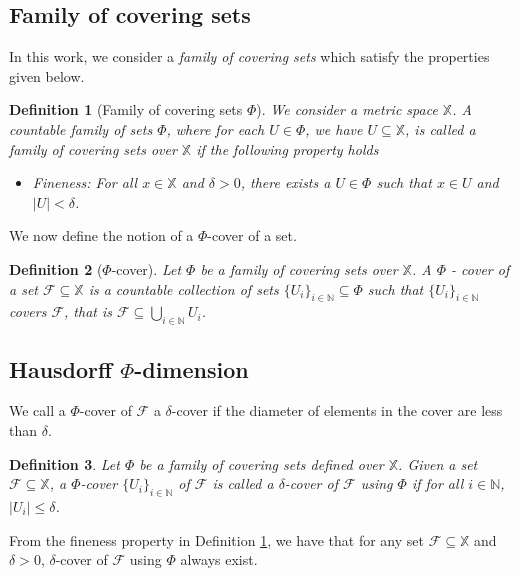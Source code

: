 \documentclass[11pt]{article}
\newtheorem{definition}{Definition}
\newcommand{\N}{\mathbb{N}}
\newcommand{\F}{{\mathcal{F}}}
\newcommand{\X}{{\mathbb{X}}}
\renewcommand{\F}{\mathcal{F}}
\newcommand{\U}{U}
\begin{document}
\subsection{Family of covering sets}

In this work, we consider a \emph{family of covering sets} which satisfy the properties given below.

\begin{definition} [Family of covering sets $\Phi$] \label{def:PhiOg} We
	consider a metric space $\X$. A countable
	family of sets $\Phi$, where for
	each $\U \in \Phi$, we have $U \subseteq \X$, is called a family of covering sets over $\X$ if the following property holds
	
	\begin{itemize}
		\item Fineness: For all $x \in \X$ and $\delta > 0$, there exists a $U \in \Phi$ such that $x \in \U$ and $|U| < \delta$. 
	\end{itemize}
\end{definition}


We now define the notion of a $\Phi$-cover of a set. 
\begin{definition} [$\Phi$-cover] \label{def:PhiCover}
	Let $\Phi$ be a family of covering sets over $\X$. A $\Phi$ - cover of a set $\F \subseteq \X$ is a countable collection of sets $\{U_i\}_{i\in\N} \subseteq \Phi$ such that $\{U_i\}_{i\in\N}$ covers $\F$, that is $\F \subseteq \bigcup\limits_{i\in\N} U_i$. 
	
\end{definition}


\subsection{ Hausdorff $\Phi$-dimension}
\label{sec:MeasureDimension}

We call a $\Phi$-cover of $\F$ a $\delta$-cover if the diameter of elements in the cover are less than $\delta$.

\begin{definition}
	Let $\Phi$ be a family of covering sets defined over
	$\X$. Given a set $\F \subseteq \X$, a 
	$\Phi$-cover $\{U_i\}_{i \in \N}$  of $\F$ is
	called a \emph{$\delta$-cover of $\F$ using $\Phi$} if for all
	$i \in \N$, $|U_i| \leq \delta$. 
\end{definition}

From the fineness property in Definition \ref{def:PhiOg}, we have that for any set $\F \subseteq \X$ and $\delta >0$, $\delta$-cover of $\F$ using $\Phi$ always exist. 
\end{document}
